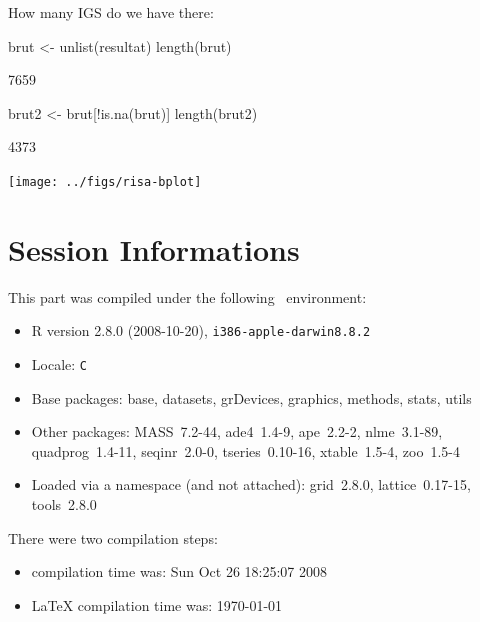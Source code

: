 \documentclass{article}
\begin{document}
How many IGS do we have there:

\begin{Schunk}
\begin{Sinput}
 brut <- unlist(resultat)
 length(brut)
\end{Sinput}
\begin{Soutput}
[1] 7659
\end{Soutput}
\begin{Sinput}
 brut2 <- brut[!is.na(brut)]
 length(brut2)
\end{Sinput}
\begin{Soutput}
[1] 4373
\end{Soutput}
\end{Schunk}

\begin{Schunk}
\end{Schunk}
\texttt{[image: ../figs/risa-bplot]}


\section*{Session Informations}

This part was compiled under the following \Rlogo{}~environment:

\begin{itemize}
  \item R version 2.8.0 (2008-10-20), \verb|i386-apple-darwin8.8.2|
  \item Locale: \verb|C|
  \item Base packages: base, datasets, grDevices, graphics, methods,
    stats, utils
  \item Other packages: MASS~7.2-44, ade4~1.4-9, ape~2.2-2,
    nlme~3.1-89, quadprog~1.4-11, seqinr~2.0-0, tseries~0.10-16,
    xtable~1.5-4, zoo~1.5-4
  \item Loaded via a namespace (and not attached): grid~2.8.0,
    lattice~0.17-15, tools~2.8.0
\end{itemize}
There were two compilation steps:

\begin{itemize}
  \item \Rlogo{} compilation time was: Sun Oct 26 18:25:07 2008
  \item \LaTeX{} compilation time was: \today
\end{itemize}


\clearpage
{}


\end{document}

